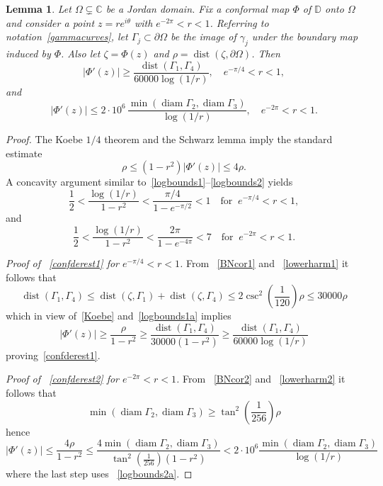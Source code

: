 \documentclass[11pt]{amsart}
\newtheorem{lemma}[theorem]{Lemma}
\theoremstyle{remark}
\numberwithin{equation}{section}
\newcommand{\C}{\mathbb{C}}
\newcommand{\DD}{\mathbb{D}}
\newcommand{\abs}[1]{\lvert#1\rvert}
\DeclareMathOperator{\dist}{dist}
\DeclareMathOperator{\diam}{diam}
\begin{document}
\begin{lemma}\label{intconf}
 Let $\Omega\subsetneq \C$ be a Jordan domain. Fix a conformal map $\Phi $  of $\DD$ onto $\Omega$ and consider a point $z = re^{i\theta}$ with $e^{-2\pi}<r<1$. Referring to notation~\eqref{gammacurves}, let $\Gamma_j\subset\partial\Omega$ be the image of $\gamma_j$ under the boundary map induced by $\Phi$. Also let $\zeta = \Phi(z)$ and $\rho = \dist(\zeta, \partial\Omega)$.  Then 
\begin{equation}\label{confderest1}
\abs{\Phi'(z)} \ge  
\frac{\dist(\Gamma_1, \Gamma_4)}{60000\log(1/r)},\quad  e^{-\pi/4} < r< 1, 
\end{equation}
and
\begin{equation}\label{confderest2}
\abs{\Phi'(z)} \le 
2\cdot 10^6\,\dfrac{\min(\diam \Gamma_2, \diam \Gamma_3)}{\log(1/r)},\quad  e^{-2\pi} < r< 1.
\end{equation}
\end{lemma}
  
\begin{proof} The Koebe $1/4$ theorem and the Schwarz lemma imply the standard estimate~\cite[Corollary 1.4]{Pomb}
\begin{equation}\label{Koebe}
  \rho \le (1-r^2) |\Phi'(z)| \le 4\rho.
\end{equation}
A concavity argument similar to~\eqref{logbounds1}--\eqref{logbounds2} yields  
\begin{equation}\label{logbounds1a}
\frac12 < \frac{\log(1/r)}{1-r^2} < \frac{\pi/4}{1-e^{-\pi/2}} < 1  \quad \text{for }\ e^{-\pi/4} < r< 1,
\end{equation}
and 
\begin{equation}\label{logbounds2a}
\frac12 < \frac{\log(1/r)}{1-r^2} < \frac{2\pi}{1-e^{-4\pi}} < 7  \quad \text{for }\ e^{-2\pi} < r< 1.
\end{equation}

\textit{Proof of ~\eqref{confderest1} for $e^{-\pi/4}< r <1$.} 
From ~\eqref{BNcor1} and ~\eqref{lowerharm1} it follows that
\[
\dist(\Gamma_1, \Gamma_4) \le 
\dist(\zeta, \Gamma_1) + \dist(\zeta, \Gamma_4) \le 
2\csc^2 \left(\frac{1}{120}\right)\rho  \le 30000 \rho
\]
which in view of~\eqref{Koebe} and~\eqref{logbounds1a} implies 
\begin{equation*}%
\abs{\Phi'(z)} \ge \frac{\rho}{1-r^2} \ge 
\frac{\dist(\Gamma_1, \Gamma_4)}{30000(1-r^2)} \ge \frac{\dist(\Gamma_1, \Gamma_4)}{60000\log(1/r)}
\end{equation*}
proving~\eqref{confderest1}.

\textit{Proof of ~\eqref{confderest2} for $e^{-2\pi}< r <1$.} From ~\eqref{BNcor2} and ~\eqref{lowerharm2} it follows that
\[
\min(\diam \Gamma_2, \diam \Gamma_3) \ge  \tan^2 \left(\frac{1}{256}\right)\rho 
\]
hence 
\[
\abs{\Phi'(z)} \le \frac{4\rho}{1-r^2} \le 
 \frac{4\min(\diam \Gamma_2, \diam \Gamma_3)}{\tan^2 \left(\frac{1}{256}\right)(1-r^2)}
< 2\cdot 10^6 \frac{\min(\diam \Gamma_2, \diam \Gamma_3)}{\log(1/r)}
\]
where the last step uses ~\eqref{logbounds2a}.
\end{proof}
\end{document}
